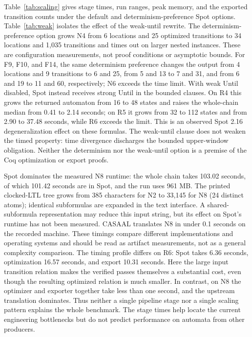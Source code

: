 \documentclass{ieeeaccess}
\begin{document}
Table~\ref{tab:scaling} gives stage times, run ranges, peak memory, and the exported transition counts under the default and determinism-preference Spot options. Table~\ref{tab:weak} isolates the effect of the weak-until rewrite. The determinism-preference option grows N4 from 6 locations and 25 optimized transitions to 34 locations and 1,035 transitions and times out on larger nested instances. These are configuration measurements, not proof conditions or asymptotic bounds.
For F9, F10, and F14, the same determinism preference changes the output
from 4 locations and 9 transitions to 6 and 25, from 5 and 13 to 7 and 31,
and from 6 and 19 to 11 and 60, respectively; N6 exceeds the time limit.
With weak Until disabled, Spot instead receives strong Until in the bounded
clauses. On R4 this grows the returned automaton from 16 to 48 states and
raises the whole-chain median from 0.41 to 2.14 seconds; on R5 it grows from
32 to 112 states and from 2.90 to 37.48 seconds, while R6 exceeds the limit.
This is an observed Spot 2.16 degeneralization effect on these formulas. The
weak-until clause does not weaken the timed property: time divergence
discharges the bounded upper-window obligation. Neither the determinism nor
the weak-until option is a premise of the Coq optimization or export proofs.

Spot dominates the measured N8 runtime: the whole chain takes 103.02 seconds,
of which 101.42 seconds are in Spot, and the run uses 961 MB. The printed
clocked-LTL tree grows from 385 characters for N2 to 33,145 for N8 (24
distinct atoms); identical subformulas are expanded in the text interface.
A shared-subformula representation may reduce this input string, but its
effect on Spot's runtime has not been measured. CASAAL translates N8 in under
0.1 seconds on the recorded machine. These timings compare different
implementations and operating systems and should be read as artifact
measurements, not as a general complexity comparison.
The timing profile differs on R6: Spot takes 6.36 seconds, optimization
16.57 seconds, and export 10.31 seconds. Here the large input transition
relation makes the verified passes themselves a substantial cost, even
though the resulting optimized relation is much smaller. In contrast, on N8
the optimizer and exporter together take less than one second, and the
upstream translation dominates. Thus neither a single pipeline stage nor a
single scaling pattern explains the whole benchmark. The stage times help
locate the current engineering bottlenecks but do not predict performance on
automata from other producers.


\end{document}
